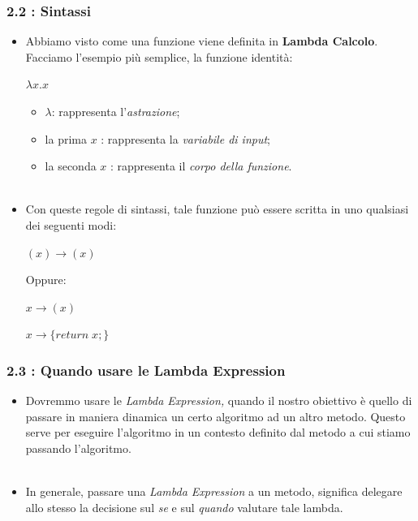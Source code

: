 \documentclass{beamer}
\begin{document}
\begin{frame}
	\frametitle{\textbf{2.2 : Sintassi}}
	\begin{itemize}
		\item
			Abbiamo visto come una funzione viene definita in \textbf{Lambda Calcolo}. Facciamo l'esempio più semplice, la funzione identità:
			\begin{center}
				\Large$\lambda x.x$
			\end{center}
			\begin{itemize}
				\item
					\Large$\lambda$: rappresenta l'\textit{astrazione};
				\item
					la prima \Large $x$ : rappresenta la \textit{variabile di input};
				\item
					la seconda \Large $x$ : rappresenta il  \textit{corpo della funzione}.\\\
			\end{itemize}	
		\item
			Con queste regole di sintassi, tale funzione pu\`o essere scritta in uno qualsiasi dei seguenti modi:
			\begin{center}
				\Large$(x)\rightarrow(x)$
			\end{center}
			Oppure:
			\begin{center}
				\Large$x\rightarrow(x)$
			\end{center}
		\begin{center}
			\Large$x\rightarrow\{return\;x;\}$
		\end{center}											
	\end{itemize}
\end{frame}


\begin{frame}
	\frametitle{\textbf{2.3 : Quando usare le Lambda Expression}}
	\begin{itemize}
		\item
			Dovremmo usare le \textit{Lambda Expression,} quando il nostro obiettivo è quello di passare in maniera dinamica un certo algoritmo ad un altro metodo. Questo serve per eseguire l'algoritmo in un contesto definito dal metodo a cui stiamo passando l'algoritmo. \\\
		\item
			In generale, passare una \textit{Lambda Expression} a un metodo, significa delegare allo stesso la decisione sul \emph{se} e sul \emph{quando} valutare tale lambda.
	\end{itemize}
\end{frame}
\end{document}
